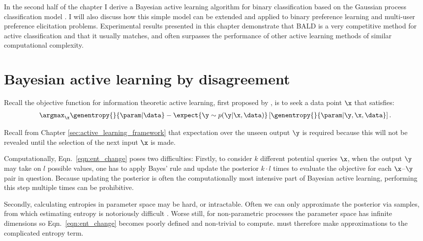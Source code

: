 In the second half of the chapter I derive a Bayesian active learning algorithm for binary classification based on the Gaussian process classification model \citep[Chapter 3]{Rasmussen2006}. I will also discuss how this simple model can be extended and applied to binary preference learning and multi-user preference elicitation problems. Experimental results presented in this chapter demonstrate that BALD is a very competitive method for active classification and that it usually matches, and often surpasses the performance of other active learning methods of similar computational complexity.

\section{Bayesian active learning by disagreement}

Recall the objective function for information theoretic active learning, first proposed by \citet{lindley1956}, is to seek a data point $\x$ that satisfies:
%
\begin{align}	
	\label{eqn:ent_change}
	\argmax_{\x} \genentropy{}{\param | \data} - \expect{\y\sim p(\y|\x,\data)} \left[ \genentropy{}{\param| \y, \x,\data} \right].
\end{align}

Recall from Chapter \ref{sec:active_learning_framework} that expectation over the unseen output $\y$ is required because this will not be revealed until the selection of the next input $\x$ is made.

Computationally, Eqn.\ \eqref{eqn:ent_change} poses two difficulties: Firstly, to consider $k$ different potential queries $\x$, when the output $\y$ may take on $l$ possible values, one has to apply Bayes' rule and update the posterior $k\cdot l$ times to evaluate the objective for each $\x$--$\y$ pair in question. Because updating the posterior is often the computationally most intensive part of Bayesian active learning, performing this step multiple times can be prohibitive.

Secondly, calculating entropies in parameter space may be hard, or intractable. Often we can only approximate the posterior via samples, from which estimating entropy is notoriously difficult \citep{panzeri2007}. Worse still, for non-parametric processes the parameter space has infinite dimensions so Eqn.\ \eqref{eqn:ent_change} becomes poorly defined and non-trivial to compute. \citep{MacKay1992, Krishnapuram2004, Lawrence2004} must therefore make approximations to the complicated entropy term.


